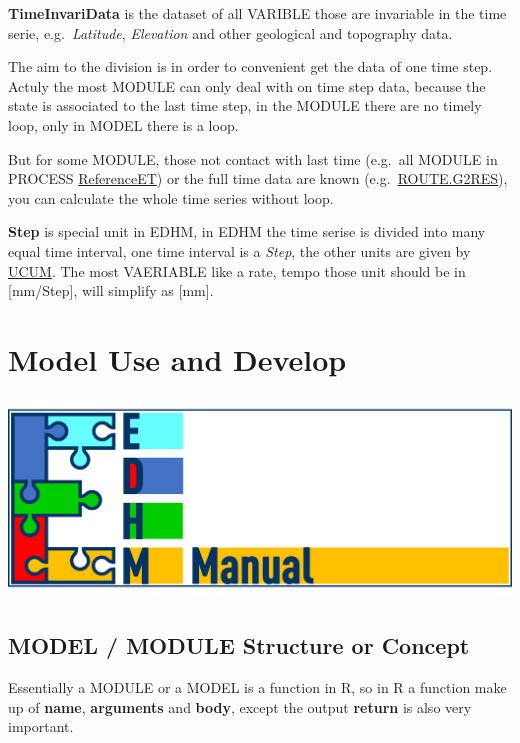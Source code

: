 \documentclass[
]{book}
\begin{document}
\textbf{TimeInvariData} is the dataset of all VARIBLE those are invariable in the time serie, e.g.~\emph{Latitude}, \emph{Elevation} and other geological and topography data.

The aim to the division is in order to convenient get the data of one time step. Actuly the most MODULE can only deal with on time step data, because the state is associated to the last time step, in the MODULE there are no timely loop, only in MODEL there is a loop.

But for some MODULE, those not contact with last time (e.g.~all MODULE in PROCESS \protect\hyperlink{ReferenceET}{ReferenceET}) or the full time data are known (e.g.~\protect\hyperlink{ROUTE.G2RES}{ROUTE.G2RES}), you can calculate the whole time series without loop.

\textbf{Step} is special unit in EDHM, in EDHM the time serise is divided into many equal time interval, one time interval is a \emph{Step}, the other units are given by \href{https://ucum.org/trac}{UCUM}. The most VAERIABLE like a rate, tempo those unit should be in {[}mm/Step{]}, will simplify as {[}mm{]}.

\hypertarget{develop}{%
\chapter{Model Use and Develop}\label{develop}}

\includegraphics{fig/EDHM_manual.png}

\hypertarget{model-module-structure-or-concept}{%
\section{MODEL / MODULE Structure or Concept}\label{model-module-structure-or-concept}}

Essentially a MODULE or a MODEL is a function in R, so in R a function make up of \textbf{name}, \textbf{arguments} and \textbf{body}, except the output \textbf{return} is also very important.
\end{document}
